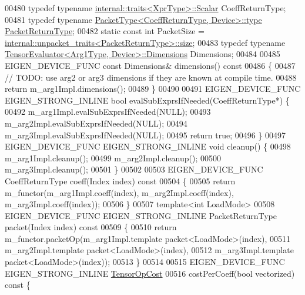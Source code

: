 \begin{DoxyCode}
00480   \textcolor{keyword}{typedef} \textcolor{keyword}{typename} \hyperlink{struct_eigen_1_1internal_1_1traits}{internal::traits<XprType>::Scalar} CoeffReturnType;
00481   \textcolor{keyword}{typedef} \textcolor{keyword}{typename} \hyperlink{group___sparse_core___module}{PacketType<CoeffReturnType, Device>::type} 
      \hyperlink{group___sparse_core___module}{PacketReturnType};
00482   \textcolor{keyword}{static} \textcolor{keyword}{const} \textcolor{keywordtype}{int} PacketSize = 
      \hyperlink{struct_eigen_1_1internal_1_1unpacket__traits}{internal::unpacket\_traits<PacketReturnType>::size};
00483   \textcolor{keyword}{typedef} \textcolor{keyword}{typename} \hyperlink{struct_eigen_1_1_tensor_evaluator}{TensorEvaluator<Arg1Type, Device>::Dimensions}
       Dimensions;
00484 
00485   EIGEN\_DEVICE\_FUNC \textcolor{keyword}{const} Dimensions& dimensions()\textcolor{keyword}{ const}
00486 \textcolor{keyword}{  }\{
00487     \textcolor{comment}{// TODO: use arg2 or arg3 dimensions if they are known at compile time.}
00488     \textcolor{keywordflow}{return} m\_arg1Impl.dimensions();
00489   \}
00490 
00491   EIGEN\_DEVICE\_FUNC EIGEN\_STRONG\_INLINE \textcolor{keywordtype}{bool} evalSubExprsIfNeeded(CoeffReturnType*) \{
00492     m\_arg1Impl.evalSubExprsIfNeeded(NULL);
00493     m\_arg2Impl.evalSubExprsIfNeeded(NULL);
00494     m\_arg3Impl.evalSubExprsIfNeeded(NULL);
00495     \textcolor{keywordflow}{return} \textcolor{keyword}{true};
00496   \}
00497   EIGEN\_DEVICE\_FUNC EIGEN\_STRONG\_INLINE \textcolor{keywordtype}{void} cleanup() \{
00498     m\_arg1Impl.cleanup();
00499     m\_arg2Impl.cleanup();
00500     m\_arg3Impl.cleanup();
00501   \}
00502 
00503   EIGEN\_DEVICE\_FUNC CoeffReturnType coeff(Index index)\textcolor{keyword}{ const}
00504 \textcolor{keyword}{  }\{
00505     \textcolor{keywordflow}{return} m\_functor(m\_arg1Impl.coeff(index), m\_arg2Impl.coeff(index), m\_arg3Impl.coeff(index));
00506   \}
00507   \textcolor{keyword}{template}<\textcolor{keywordtype}{int} LoadMode>
00508   EIGEN\_DEVICE\_FUNC EIGEN\_STRONG\_INLINE PacketReturnType packet(Index index)\textcolor{keyword}{ const}
00509 \textcolor{keyword}{  }\{
00510     \textcolor{keywordflow}{return} m\_functor.packetOp(m\_arg1Impl.template packet<LoadMode>(index),
00511                               m\_arg2Impl.template packet<LoadMode>(index),
00512                               m\_arg3Impl.template packet<LoadMode>(index));
00513   \}
00514 
00515   EIGEN\_DEVICE\_FUNC EIGEN\_STRONG\_INLINE \hyperlink{class_eigen_1_1_tensor_op_cost}{TensorOpCost}
00516   costPerCoeff(\textcolor{keywordtype}{bool} vectorized)\textcolor{keyword}{ const }\{

\end{DoxyCode}
